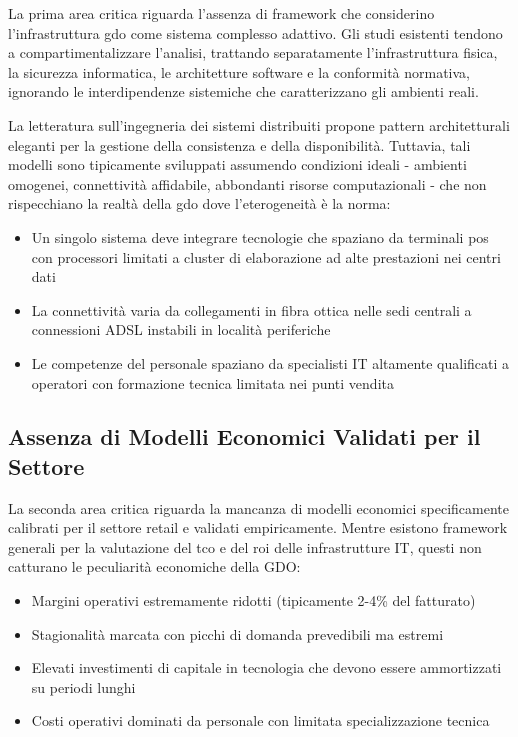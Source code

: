 La prima area critica riguarda l'assenza di framework che considerino l'infrastruttura \gls{gdo} come sistema complesso adattivo. Gli studi esistenti tendono a compartimentalizzare l'analisi, trattando separatamente l'infrastruttura fisica, la sicurezza informatica, le architetture software e la conformità normativa, ignorando le interdipendenze sistemiche che caratterizzano gli ambienti reali.

La letteratura sull'ingegneria dei sistemi distribuiti propone pattern architetturali eleganti per la gestione della consistenza e della disponibilità. Tuttavia, tali modelli sono tipicamente sviluppati assumendo condizioni ideali - ambienti omogenei, connettività affidabile, abbondanti risorse computazionali - che non rispecchiano la realtà della \gls{gdo} dove l'eterogeneità è la norma:

\begin{itemize}
\item Un singolo sistema deve integrare tecnologie che spaziano da terminali \gls{pos} con processori limitati a cluster di elaborazione ad alte prestazioni nei centri dati
\item La connettività varia da collegamenti in fibra ottica nelle sedi centrali a connessioni ADSL instabili in località periferiche
\item Le competenze del personale spaziano da specialisti IT altamente qualificati a operatori con formazione tecnica limitata nei punti vendita
\end{itemize}

\subsection{\texorpdfstring{\textbf{Assenza di Modelli Economici Validati per il Settore}}{1.2.2 - Assenza di Modelli Economici Validati per il Settore}}
\label{subsec:assenza_modelli}

La seconda area critica riguarda la mancanza di modelli economici specificamente calibrati per il settore retail e validati empiricamente. Mentre esistono framework generali per la valutazione del \gls{tco} e del \gls{roi} delle infrastrutture IT, questi non catturano le peculiarità economiche della GDO:

\begin{itemize}
\item Margini operativi estremamente ridotti (tipicamente 2-4\% del fatturato)
\item Stagionalità marcata con picchi di domanda prevedibili ma estremi
\item Elevati investimenti di capitale in tecnologia che devono essere ammortizzati su periodi lunghi
\item Costi operativi dominati da personale con limitata specializzazione tecnica
\end{itemize}

